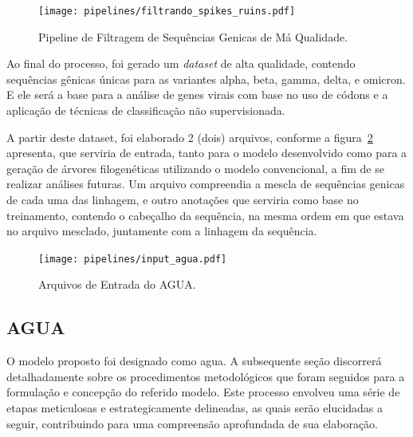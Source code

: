 \begin{enumerate}
        \begin{figure}[htb]
          \centering
          \caption{Pipeline de Filtragem de Sequências Genicas de Má Qualidade.}
          \texttt{[image: pipelines/filtrando\_spikes\_ruins.pdf]}
          ~\label{fig:spikesRuins}
        \end{figure}
\end{enumerate}

Ao final do processo, foi gerado um \textit{dataset} de alta qualidade, contendo sequências gênicas únicas para as variantes alpha, beta, gamma, delta, e omicron. E ele será a base para a análise de genes virais com base no uso de códons e a aplicação de técnicas de classificação não supervisionada.

A partir deste dataset, foi elaborado 2 (dois) arquivos, conforme a figura~\ref{fig:inputAgua} apresenta, que serviria de entrada, tanto para o modelo desenvolvido como para a geração de árvores filogenéticas utilizando o modelo convencional, a fim de se realizar análises futuras. Um arquivo compreendia a mescla de sequências genicas de cada uma das linhagem, e outro anotações que serviria como base no treinamento, contendo o cabeçalho da sequência, na mesma ordem em que estava no arquivo mesclado, juntamente com a linhagem da sequência.

\begin{figure}[htb]
  \centering
  \caption{Arquivos de Entrada do AGUA.}
  \texttt{[image: pipelines/input\_agua.pdf]}
  ~\label{fig:inputAgua}
\end{figure}

\subsection{AGUA}
O modelo proposto foi designado como \gls{agua}. A subsequente seção discorrerá detalhadamente sobre os procedimentos metodológicos que foram seguidos para a formulação e concepção do referido modelo. Este processo envolveu uma série de etapas meticulosas e estrategicamente delineadas, as quais serão elucidadas a seguir, contribuindo para uma compreensão aprofundada de sua elaboração.

